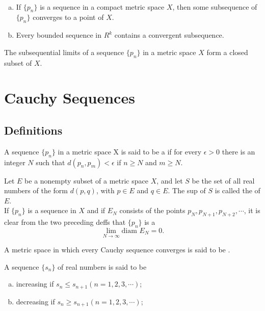 \begin{thm}
	~
	\begin{enumerate}[(a)]
		\item If $\{p_n\}$ is a sequence in a compact metric space $X$, then some subsequence of $\{p_n\}$ converges to a point of $X$.
		\item Every bounded sequence in $R^k$ contains a convergent subsequence.
	\end{enumerate}
\end{thm}

\begin{thm}
	The subsequential limits of a sequence $\{p_n\}$ in a metric space $X$ form a closed subset of $X$.
\end{thm}

\section{Cauchy Sequences}
\subsection{Definitions}
\begin{deff}
	A sequence $\{p_n\}$ in a metric space X is said to be a {} if for every $\epsilon>0$ there is an integer $N$ such that $d(p_n,p_m)<\epsilon$ if $n\geq N$ and $m\geq N$.
\end{deff}

\begin{deff}
	Let $E$ be a nonempty subset of a metric space $X$, and let $S$ be the set of all real numbers of the form $d(p,q)$, with $p\in E$ and $q\in E$. The sup of $S$ is called the {} of $E$.\\
	If $\{p_n\}$ is a sequence in $X$ and if $E_N$ consists of the points $p_N, p_{N+1}, p_{N+2}, \cdots$, it is clear from the two preceding deffs that $\{p_n\}$ is a {} $$\lim_{N \to \infty} \text{diam }E_N =0.$$
\end{deff}

\begin{deff}
	A metric space in which every Cauchy sequence converges is said to be {}.
\end{deff}

\begin{deff}
	A sequence $\{s_n\}$ of real numbers is said to be
	\begin{enumerate}[(a)]
		\item {} increasing if $s_n \leq s_{n+1} (n=1,2,3,\cdots)$;
		\item {} decreasing if $s_n \geq s_{n+1} (n=1,2,3,\cdots)$;
	\end{enumerate}
\end{deff}

